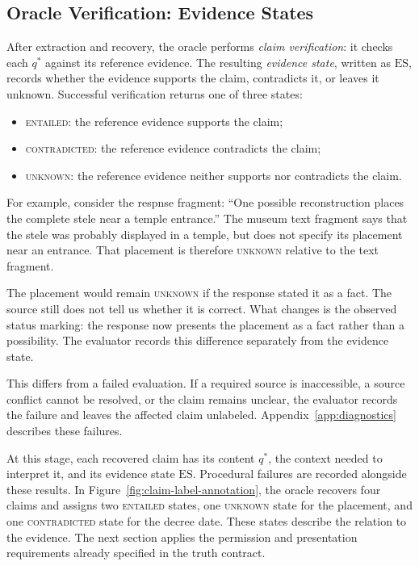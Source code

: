 \documentclass{clv2025}
\begin{document}
\subsection{Oracle Verification: Evidence States}\label{subsec:verification}

After extraction and recovery, the oracle performs \emph{claim verification}:
it checks each $q^*$ against its reference evidence. The resulting
\emph{evidence state}, written as $\mathrm{ES}$, records whether the evidence
supports the claim, contradicts it, or leaves it unknown. Successful
verification returns one of three states:
\begin{itemize}
\item \textsc{entailed}: the reference evidence supports the claim;
\item \textsc{contradicted}: the reference evidence contradicts the claim;
\item \textsc{unknown}: the reference evidence neither supports nor
contradicts the claim.
\end{itemize}
For example, consider the respnse fragment: ``One possible reconstruction places the complete
stele near a temple entrance.'' The museum text fragment says that the
stele was probably displayed in a temple, but does not specify its
placement near an entrance. That placement is therefore \textsc{unknown}
relative to the text fragment.

The placement would remain \textsc{unknown} if the response stated it as a
fact. The source still does not tell us whether it is correct. What changes
is the observed status marking: the response now presents the placement
as a fact rather than a possibility. The evaluator records this difference
separately from the evidence state.


This differs from a failed evaluation. If a required source is inaccessible,
a source conflict cannot be resolved, or the claim remains unclear, the
evaluator records the failure and leaves the affected claim unlabeled. Appendix~\ref{app:diagnostics} describes these failures.

At this stage, each recovered claim has its content $q^*$, the context
needed to interpret it, and its evidence state $\mathrm{ES}$. Procedural
failures are recorded alongside these results. In
Figure~\ref{fig:claim-label-annotation}, the oracle recovers four claims and
assigns two \textsc{entailed} states, one \textsc{unknown} state for the
placement, and one \textsc{contradicted} state for the decree date. These
states describe the relation to the evidence. The next section applies
the permission and presentation requirements already specified in the
truth contract.
\end{document}
